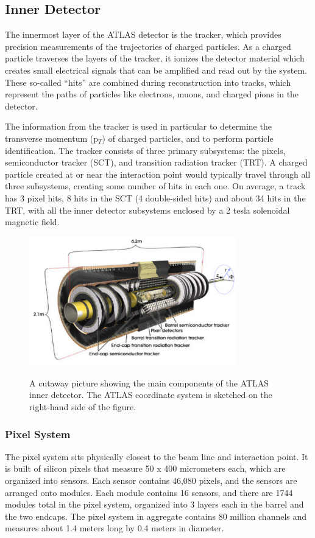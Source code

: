 \subsection{Inner Detector}
The innermost layer of the ATLAS detector is the tracker, which provides precision measurements of the trajectories of charged particles.  As a charged particle traverses the layers of the tracker, it ionizes the detector material which creates small electrical signals that can be amplified and read out by the system.  These so-called ``hits'' are combined during reconstruction into tracks, which represent the paths of particles like electrons, muons, and charged pions in the detector.

The information from the tracker is used in particular to determine the transverse momentum (p$_T$) of charged particles, and to perform particle identification.  The tracker consists of three primary subsystems: the pixels, semiconductor tracker (SCT), and transition radiation tracker (TRT).  A charged particle created at or near the interaction point would typically travel through all three subsystems, creating some number of hits in each one.  On average, a track has 3 pixel hits, 8 hits in the SCT (4 double-sided hits) and about 34 hits in the TRT, with all the inner detector subsystems enclosed by a 2 tesla solenoidal magnetic field. 


\begin{figure}
	\includegraphics[width=0.8\textwidth]{ATLASDetector/images/innerDetector.pdf}
	\label{fig:inner_detector}  
	\caption{A cutaway picture showing the main components of the ATLAS inner detector.  The ATLAS coordinate system is sketched on the right-hand side of the figure.}
\end{figure}


\subsubsection{Pixel System}
\label{sec:pixel}
The pixel system sits physically closest to the beam line and interaction point.  It is built of silicon pixels that measure 50 x 400 micrometers each, which are organized into sensors.  Each sensor contains 46,080 pixels, and the sensors are arranged onto modules.  Each module contains 16 sensors, and there are 1744 modules total in the pixel system, organized into 3 layers each in the barrel and the two endcaps.  The pixel system in aggregate contains 80 million channels and measures about 1.4 meters long by 0.4 meters in diameter.

